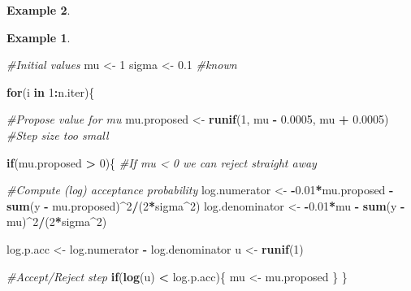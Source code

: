 \documentclass[
]{book}
\newenvironment{Shaded}{\begin{snugshade}}{\end{snugshade}}
\newcommand{\CommentTok}[1]{\textcolor[rgb]{0.56,0.35,0.01}{\textit{#1}}}
\newcommand{\ControlFlowTok}[1]{\textcolor[rgb]{0.13,0.29,0.53}{\textbf{#1}}}
\newcommand{\DecValTok}[1]{\textcolor[rgb]{0.00,0.00,0.81}{#1}}
\newcommand{\FloatTok}[1]{\textcolor[rgb]{0.00,0.00,0.81}{#1}}
\newcommand{\FunctionTok}[1]{\textcolor[rgb]{0.13,0.29,0.53}{\textbf{#1}}}
\newcommand{\NormalTok}[1]{#1}
\newcommand{\OtherTok}[1]{\textcolor[rgb]{0.56,0.35,0.01}{#1}}
\newcommand{\SpecialCharTok}[1]{\textcolor[rgb]{0.81,0.36,0.00}{\textbf{#1}}}
\theoremstyle{definition}
\theoremstyle{definition}
\newtheorem{example}{Example}[chapter]
\theoremstyle{definition}
\theoremstyle{definition}
\theoremstyle{remark}
\begin{document}
\begin{example}
\begin{example}
\begin{Shaded}
\begin{Highlighting}[]
\CommentTok{\#Initial values}
\NormalTok{mu }\OtherTok{\textless{}{-}} \DecValTok{1} 
\NormalTok{sigma }\OtherTok{\textless{}{-}} \FloatTok{0.1} \CommentTok{\#known}

\ControlFlowTok{for}\NormalTok{(i }\ControlFlowTok{in} \DecValTok{1}\SpecialCharTok{:}\NormalTok{n.iter)\{}
  
  \CommentTok{\#Propose value for mu}
\NormalTok{  mu.proposed }\OtherTok{\textless{}{-}} \FunctionTok{runif}\NormalTok{(}\DecValTok{1}\NormalTok{, mu }\SpecialCharTok{{-}} \FloatTok{0.0005}\NormalTok{, mu }\SpecialCharTok{+} \FloatTok{0.0005}\NormalTok{) }\CommentTok{\#Step size too small}
  
  \ControlFlowTok{if}\NormalTok{(mu.proposed }\SpecialCharTok{\textgreater{}} \DecValTok{0}\NormalTok{)\{ }\CommentTok{\#If mu \textless{} 0 we can reject straight away}
    
    \CommentTok{\#Compute (log) acceptance probability}
\NormalTok{    log.numerator   }\OtherTok{\textless{}{-}} \SpecialCharTok{{-}}\FloatTok{0.01}\SpecialCharTok{*}\NormalTok{mu.proposed }\SpecialCharTok{{-}}
                        \FunctionTok{sum}\NormalTok{(y }\SpecialCharTok{{-}}\NormalTok{ mu.proposed)}\SpecialCharTok{\^{}}\DecValTok{2}\SpecialCharTok{/}\NormalTok{(}\DecValTok{2}\SpecialCharTok{*}\NormalTok{sigma}\SpecialCharTok{\^{}}\DecValTok{2}\NormalTok{)}
\NormalTok{    log.denominator }\OtherTok{\textless{}{-}} \SpecialCharTok{{-}}\FloatTok{0.01}\SpecialCharTok{*}\NormalTok{mu }\SpecialCharTok{{-}} \FunctionTok{sum}\NormalTok{(y }\SpecialCharTok{{-}}\NormalTok{ mu)}\SpecialCharTok{\^{}}\DecValTok{2}\SpecialCharTok{/}\NormalTok{(}\DecValTok{2}\SpecialCharTok{*}\NormalTok{sigma}\SpecialCharTok{\^{}}\DecValTok{2}\NormalTok{)}
    
\NormalTok{    log.p.acc }\OtherTok{\textless{}{-}}\NormalTok{ log.numerator }\SpecialCharTok{{-}}\NormalTok{ log.denominator}
\NormalTok{    u }\OtherTok{\textless{}{-}} \FunctionTok{runif}\NormalTok{(}\DecValTok{1}\NormalTok{)}
    
    \CommentTok{\#Accept/Reject step}
    \ControlFlowTok{if}\NormalTok{(}\FunctionTok{log}\NormalTok{(u) }\SpecialCharTok{\textless{}}\NormalTok{ log.p.acc)\{}
\NormalTok{      mu }\OtherTok{\textless{}{-}}\NormalTok{ mu.proposed}
\NormalTok{    \}}
\NormalTok{  \}}
  

\end{Highlighting}
\end{Shaded}
\end{example}
\end{example}
\end{document}
